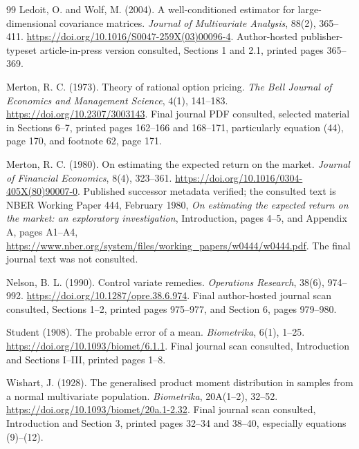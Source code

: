 \documentclass[11pt]{article}
\begin{document}
\begin{thebibliography}{99}
Ledoit, O. and Wolf, M. (2004). A well-conditioned estimator for large-dimensional covariance matrices. \emph{Journal of Multivariate Analysis}, 88(2), 365--411. \url{https://doi.org/10.1016/S0047-259X(03)00096-4}. Author-hosted publisher-typeset article-in-press version consulted, Sections 1 and 2.1, printed pages 365--369.

Merton, R. C. (1973). Theory of rational option pricing. \emph{The Bell Journal of Economics and Management Science}, 4(1), 141--183. \url{https://doi.org/10.2307/3003143}. Final journal PDF consulted, selected material in Sections 6--7, printed pages 162--166 and 168--171, particularly equation (44), page 170, and footnote 62, page 171.

Merton, R. C. (1980). On estimating the expected return on the market. \emph{Journal of Financial Economics}, 8(4), 323--361. \url{https://doi.org/10.1016/0304-405X(80)90007-0}. Published successor metadata verified; the consulted text is NBER Working Paper 444, February 1980, \emph{On estimating the expected return on the market: an exploratory investigation}, Introduction, pages 4--5, and Appendix A, pages A1--A4, \url{https://www.nber.org/system/files/working_papers/w0444/w0444.pdf}. The final journal text was not consulted.

Nelson, B. L. (1990). Control variate remedies. \emph{Operations Research}, 38(6), 974--992. \url{https://doi.org/10.1287/opre.38.6.974}. Final author-hosted journal scan consulted, Sections 1--2, printed pages 975--977, and Section 6, pages 979--980.

Student (1908). The probable error of a mean. \emph{Biometrika}, 6(1), 1--25. \url{https://doi.org/10.1093/biomet/6.1.1}. Final journal scan consulted, Introduction and Sections I--III, printed pages 1--8.

Wishart, J. (1928). The generalised product moment distribution in samples from a normal multivariate population. \emph{Biometrika}, 20A(1--2), 32--52. \url{https://doi.org/10.1093/biomet/20a.1-2.32}. Final journal scan consulted, Introduction and Section 3, printed pages 32--34 and 38--40, especially equations (9)--(12).
\end{thebibliography}
\end{document}
